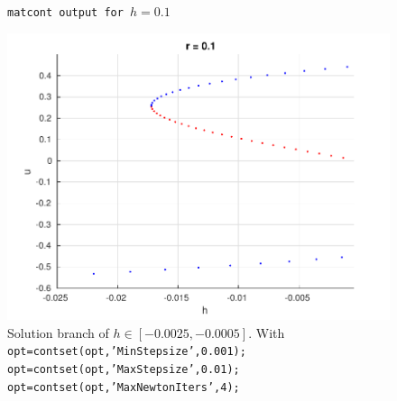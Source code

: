 \begin{figure}


\caption{\texttt{matcont output for $h=0.1$}}
\end{figure}

\begin{figure}

\end{figure}

\begin{figure}
\includegraphics[scale = 1]{./plots/lastExercise.pdf}
\caption{Solution branch of $h \in [-0.0025,-0.0005].$ With \texttt{ opt=contset(opt,'MinStepsize',0.001);
 opt=contset(opt,'MaxStepsize',0.01); 
 opt=contset(opt,'MaxNewtonIters',4);}}
\end{figure}




